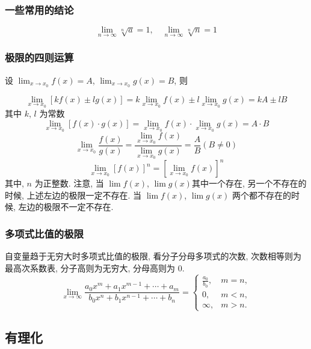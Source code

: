 \begin{knowledge}
  \subsubsection{一些常用的结论}
  \[
    \lim_{n \to \infty} \sqrt[n]{a} = 1,
    \quad
    \lim_{n \to \infty} \sqrt[n]{n} = 1
  \]

  \subsubsection{极限的四则运算}

  设 $\lim _{x \to x_{0}}f(x)=A$, $\lim _{x \to x_{0}}g(x)=B$,
  则

  \[
    \lim _{x \to x_{0}}[kf(x)\pm lg(x)]
    = k \lim _{x \to x_{0}}f(x)\pm l \lim _{x \to x_{0}}g(x)
    = kA\pm lB
  \]
  其中 $k$, $l$ 为常数
  \[
    \lim _{x \to x_{0}}[f(x)\cdot g(x)]
    = \lim _{x \to x_{0}}f(x)\cdot \lim _{x \to x_{0}}g(x)
    = A\cdot B
  \]
  \[
    \lim _{x \to x_{0}}\frac{f(x)}{g(x)}
    = \frac{\lim \limits _{x \to x_{0}}f(x)}{\lim \limits _{x \to x_{0}}g(x)}
    = \frac{A}{B}(B\neq 0)
  \]
  \[
    \lim _{x \to x_{0}}[f(x)]^{n}
    = [\lim _{x \to x_{0}}f(x)]^{n}
  \]
  其中, $n$ 为正整数.
  注意, 当 $\lim f(x)$, $\lim g(x) $其中一个存在,
  另一个不存在的时候,
  上述左边的极限一定不存在.
  当 $\lim f(x)$, $\lim g(x)$ 两个都不存在的时候,
  左边的极限不一定不存在.

  \subsubsection{多项式比值的极限}

  自变量趋于无穷大时多项式比值的极限,
  看分子分母多项式的次数,
  次数相等则为最高次系数表,
  分子高则为无穷大,
  分母高则为 $0$.
  \[
    \lim _{x \to \infty}\frac{a_0x^m+a_1x^{m-1}+\cdots +a_m}{b_0x^n+b_1x^{n-1}+\cdots +b_n}=\begin{cases}
      \frac{a_0}{b_0}, & m=n,  \\
      0,               & m<n,  \\
      \infty,          & m>n.
    \end{cases}
  \]
\end{knowledge}

\subsection{有理化}

